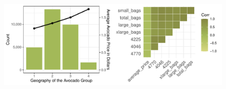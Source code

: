 \documentclass[11pt]{article}\usepackage[]{graphicx}\usepackage[]{color}
\makeatletter
\def\maxwidth{ %
  \ifdim\Gin@nat@width>\linewidth
    \linewidth
  \else
    \Gin@nat@width
  \fi
}
\makeatother
\begin{document}
\begin{figure}[h!] 
\begin{center}

\includegraphics[width=\maxwidth]{figure/unnamed-chunk-3-1} 

\caption{}
\label{explore3}
\end{center} 
\end{figure}
\end{document}
